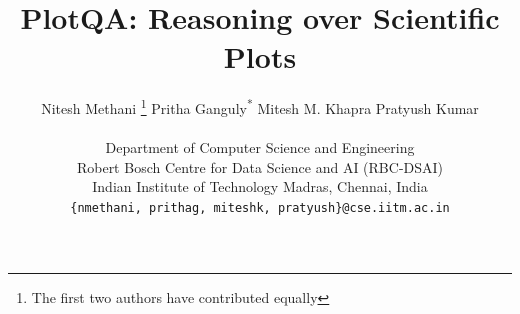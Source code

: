 \documentclass[10pt,twocolumn,letterpaper]{article}
\begin{document}
\newcommand{\MK}[1]{\textcolor{black}{#1}}
\newcommand{\PN}[1]{\textcolor{black}{#1}}

\title{PlotQA: Reasoning over Scientific Plots}

\author{Nitesh Methani \thanks{The first two authors have contributed equally} \hspace{1cm} Pritha Ganguly\textsuperscript{*} \hspace{1cm} Mitesh M. Khapra \hspace{1cm} Pratyush Kumar \\\\
Department of Computer Science and Engineering\\
Robert Bosch Centre for Data Science and AI (RBC-DSAI)\\
Indian Institute of Technology Madras, Chennai, India\\
{\tt\small \{nmethani, prithag, miteshk, pratyush\}@cse.iitm.ac.in}
}

\newcommand{\revision}[1][\textcolor{black}]{#1}%
\newcommand{\delete}[1][\textcolor{b}]{#1}%

\maketitle
\ifwacvfinal\thispagestyle{empty}\fi
\end{document}
